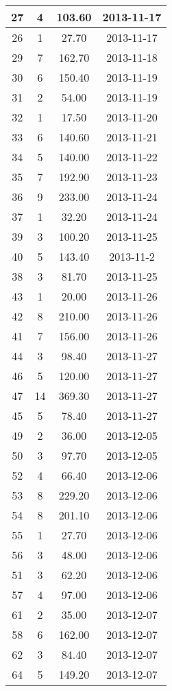 \documentclass[a4paper,10pt]{report}
\begin{document}
\begin{longtable}{|c|c|c|c|}
27 &  4 & 103.60 & 2013-11-17\\ \hline
26 &  1 &  27.70 & 2013-11-17\\ \hline
29 &  7 & 162.70 & 2013-11-18\\ \hline
30 &  6 & 150.40 & 2013-11-19\\ \hline
31 &  2 &  54.00 & 2013-11-19\\ \hline
32 &  1 &  17.50 & 2013-11-20\\ \hline
33 &  6 & 140.60 & 2013-11-21\\ \hline
34 &  5 & 140.00 & 2013-11-22\\ \hline
35 &  7 & 192.90 & 2013-11-23\\ \hline
36 &  9 & 233.00 & 2013-11-24\\ \hline
37 &  1 &  32.20 & 2013-11-24\\ \hline
39 &  3 & 100.20 & 2013-11-25\\ \hline
40 &   5 & 143.40 & 2013-11-2\\ \hline
38 &  3 & 81.70 &2013-11-25\\ \hline
43 &  1 & 20.00 &2013-11-26\\ \hline
42 &  8 &210.00 &2013-11-26\\ \hline
41 &  7 &156.00 &2013-11-26\\ \hline
44 &  3 & 98.40 &2013-11-27\\ \hline
46 &  5 &120.00 &2013-11-27\\ \hline
47 & 14 &369.30 &2013-11-27\\ \hline
45 &  5 & 78.40 &2013-11-27\\ \hline
49 &  2 & 36.00 &2013-12-05\\ \hline
50 &  3 & 97.70 &2013-12-05\\ \hline
52 &  4 & 66.40 &2013-12-06\\ \hline
53 &  8 &229.20 &2013-12-06\\ \hline
54 &  8 &201.10 &2013-12-06\\ \hline
55 &  1 & 27.70 &2013-12-06\\ \hline
56 &  3 & 48.00 &2013-12-06\\ \hline
51 &  3 & 62.20 &2013-12-06\\ \hline
57 &  4 & 97.00 &2013-12-06\\ \hline
61 &  2 & 35.00 &2013-12-07\\ \hline
58 &  6 &162.00 &2013-12-07\\ \hline
62 &  3 & 84.40 &2013-12-07\\ \hline
64 &  5 &149.20 &2013-12-07\\ \hline

\end{longtable}
\end{document}
